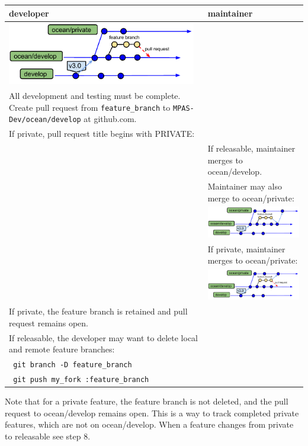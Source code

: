 \documentclass[11pt]{article}
\begin{document}
\begin{enumerate}
\begin{centering}
\end{centering}
 \begin{tabular}[c]{L{3.3in}|L{3.3in}}
developer & maintainer \\
\hline
\includegraphics[width=3.25in]{f/MPASworkflow_3a.pdf} \\
All development and testing must be complete.
Create pull request from \verb|feature_branch| to \verb|MPAS-Dev/ocean/develop| at github.com. \\
If private, pull request title begins with PRIVATE: \\
& If releasable, maintainer merges to ocean/develop.\\
& Maintainer may also merge to ocean/private: \\
& \includegraphics[width=3.25in]{f/MPASworkflow_3b.pdf} \\
& If private, maintainer merges to ocean/private:\\
& \includegraphics[width=3.25in]{f/MPASworkflow_3c.pdf} \\
If private, the feature branch is retained and pull request remains open.\\
If releasable, the developer may want to delete local and remote feature branches: \\
\verb| git branch -D feature_branch|  \\
\verb| git push my_fork :feature_branch| \\
 \end{tabular}

Note that for a private feature, the feature branch is not deleted, and the pull request to ocean/develop remains open.  This is a way to track completed private features, which are not on ocean/develop.  When a feature changes from private to releasable see step 8.




\end{enumerate}
\end{document}
